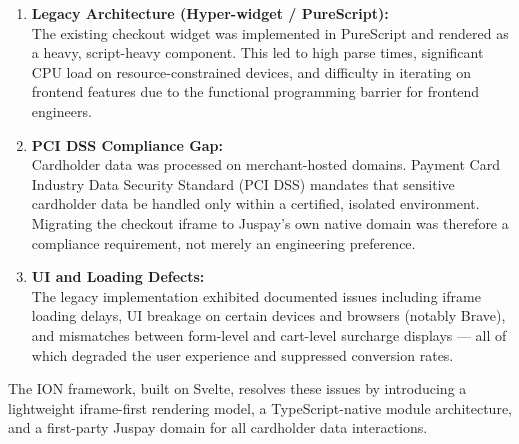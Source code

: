 \begin{enumerate}
  \item \textbf{Legacy Architecture (Hyper-widget / PureScript):}\\
  The existing checkout widget was implemented in PureScript and rendered as a heavy, script-heavy component. This led to high parse times, significant CPU load on resource-constrained devices, and difficulty in iterating on frontend features due to the functional programming barrier for frontend engineers.

  \item \textbf{PCI DSS Compliance Gap:}\\
  Cardholder data was processed on merchant-hosted domains. Payment Card Industry Data Security Standard (PCI DSS) mandates that sensitive cardholder data be handled only within a certified, isolated environment. Migrating the checkout iframe to Juspay's own native domain was therefore a compliance requirement, not merely an engineering preference.

  \item \textbf{UI and Loading Defects:}\\
  The legacy implementation exhibited documented issues including iframe loading delays, UI breakage on certain devices and browsers (notably Brave), and mismatches between form-level and cart-level surcharge displays --- all of which degraded the user experience and suppressed conversion rates.
\end{enumerate}

\par The ION framework, built on Svelte, resolves these issues by introducing a lightweight iframe-first rendering model, a TypeScript-native module architecture, and a first-party Juspay domain for all cardholder data interactions.
